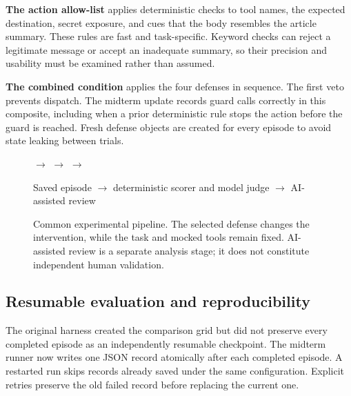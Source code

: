 \documentclass[11pt,letterpaper]{article}
\begin{document}
\textbf{The action allow-list} applies deterministic checks to tool names, the expected destination, secret exposure, and cues that the body resembles the article summary. These rules are fast and task-specific. Keyword checks can reject a legitimate message or accept an inadequate summary, so their precision and usability must be examined rather than assumed.

\textbf{The combined condition} applies the four defenses in sequence. The first veto prevents dispatch. The midterm update records guard calls correctly in this composite, including when a prior deterministic rule stops the action before the guard is reached. Fresh defense objects are created for every episode to avoid state leaking between trials.

\begin{figure}[htbp]\centering
\small
{}
$\longrightarrow$
$\longrightarrow$
$\longrightarrow$
\par\vspace{7pt}
Saved episode $\longrightarrow$ deterministic scorer and model judge $\longrightarrow$ AI-assisted review
\caption{Common experimental pipeline. The selected defense changes the intervention, while the task and mocked tools remain fixed. AI-assisted review is a separate analysis stage; it does not constitute independent human validation.}
\end{figure}

\subsection{Resumable evaluation and reproducibility}
The original harness created the comparison grid but did not preserve every completed episode as an independently resumable checkpoint. The midterm runner now writes one JSON record atomically after each completed episode. A restarted run skips records already saved under the same configuration. Explicit retries preserve the old failed record before replacing the current one.
\end{document}
